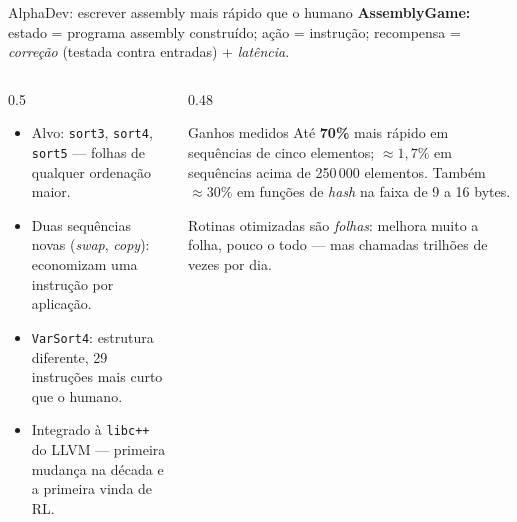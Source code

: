 \documentclass[aspectratio=169, 10pt]{beamer}
\begin{document}
\begin{frame}{AlphaDev: escrever assembly mais rápido que o humano}
  \small
  \textbf{AssemblyGame:} estado = programa assembly construído; ação = instrução; recompensa = \emph{correção} (testada contra entradas) + \emph{latência}.

  \begin{columns}[T]
    \begin{column}{0.5\textwidth}
      \begin{itemize}
        \item Alvo: \texttt{sort3}, \texttt{sort4}, \texttt{sort5} — folhas de qualquer ordenação maior.
        \item Duas sequências novas (\emph{swap}, \emph{copy}): economizam uma instrução por aplicação.
        \item \texttt{VarSort4}: estrutura diferente, 29 instruções mais curto que o humano.
        \item Integrado à \texttt{libc++} do LLVM — primeira mudança na década e a primeira vinda de RL.
      \end{itemize}
    \end{column}
    \begin{column}{0.48\textwidth}
      \begin{teobox}{Ganhos medidos}
        Até \textbf{70\%} mais rápido em sequências de cinco elementos;
        $\approx 1{,}7\%$ em sequências acima de 250\,000 elementos.
        Também $\approx 30\%$ em funções de \emph{hash} na faixa de 9 a 16 bytes.
      \end{teobox}
      \begin{ideiabox}
        Rotinas otimizadas são \emph{folhas}: melhora muito a folha, pouco o todo — mas chamadas trilhões de vezes por dia.
      \end{ideiabox}
    \end{column}
  \end{columns}
\end{frame}
\end{document}
